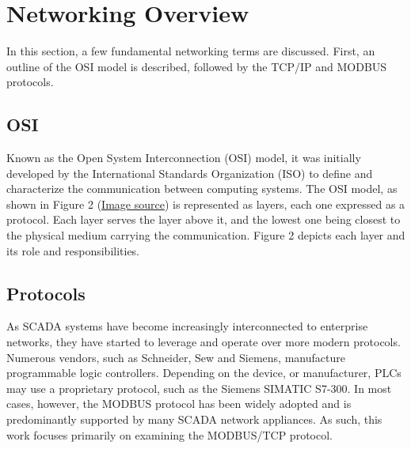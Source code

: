 \documentclass[11pt,a4paper]{article}
\begin{document}
\clearpage

\section{Networking Overview}\label{networking-overview}

In this section, a few fundamental networking terms are discussed.
First, an outline of the OSI model is described, followed by the TCP/IP
and MODBUS protocols.

\subsection{OSI}\label{osi}

Known as the Open System Interconnection (OSI) model, it was initially
developed by the International Standards Organization (ISO) to define
and characterize the communication between computing systems. The OSI
model, as shown in Figure 2
(\href{https://engineering.linkedin.com/endorsements/geographic-trends-skills-using-linkedins-endorsement-feature}{Image
source}) is represented as layers, each one expressed as a protocol.
Each layer serves the layer above it, and the lowest one being closest
to the physical medium carrying the communication. Figure 2 depicts each
layer and its role and responsibilities.

\subsection{Protocols}\label{protocols}

As SCADA systems have become increasingly interconnected to enterprise
networks, they have started to leverage and operate over more modern
protocols. Numerous vendors, such as Schneider, Sew and Siemens,
manufacture programmable logic controllers. Depending on the device, or
manufacturer, PLCs may use a proprietary protocol, such as the Siemens
SIMATIC S7-300. In most cases, however, the MODBUS protocol has been
widely adopted and is predominantly supported by many SCADA network
appliances. As such, this work focuses primarily on examining the
MODBUS/TCP protocol.
\end{document}
